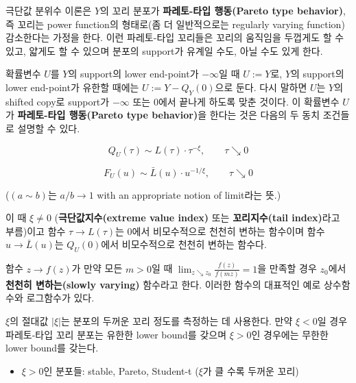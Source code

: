 \documentclass[b5paper,]{scrbook}
\providecommand{\tightlist}{%
  \setlength{\itemsep}{0pt}\setlength{\parskip}{0pt}}
\theoremstyle{plain}
\theoremstyle{definition}
\numberwithin{equation}{section}
\let\BeginKnitrBlock\begin \let\EndKnitrBlock\end
\begin{document}
극단값 분위수 이론은 \(Y\)의 꼬리 분포가 \textbf{파레토-타입 행동(Pareto type behavior)}, 즉 꼬리는 power function의 형태로(좀 더 일반적으로는 regularly varying function) 감소한다는 가정을 한다. 이런 파레토-타입 꼬리들은 꼬리의 움직임을 두껍게도 할 수 있고, 얇게도 할 수 있으며 분포의 support가 유계일 수도, 아닐 수도 있게 한다.

확률변수 \(U\)를 \(Y\)의 support의 lower end-point가 \(-\infty\)일 때 \(U:=Y\)로, \(Y\)의 support의 lower end-point가 유한할 때에는 \(U:=Y-Q_{Y}(0)\)으로 둔다. 다시 말하면 \(U\)는 \(Y\)의 shifted copy로 support가 \(-\infty\) 또는 \(0\)에서 끝나게 하도록 맞춘 것이다. 이 확률변수 \(U\)가 \textbf{파레토-타입 행동(Pareto type behavior)}을 한다는 것은 다음의 두 동치 조건들로 설명할 수 있다.

\begin{equation}
Q_{U}(\tau)\sim L(\tau)\cdot \tau^{-\xi}, \qquad{\tau\searrow 0}
\label{eq:Paretotypetail}
\end{equation}

\begin{equation}
F_{U}(u)\sim \bar{L}(u)\cdot u^{-1/\xi}, \qquad{\tau\searrow 0}
\end{equation}

(\((a\sim b)\)는 \(a/b\rightarrow 1\) with an appropriate notion of limit라는 뜻.)

이 때 \(\xi \neq 0\) (\textbf{극단값지수(extreme value index)} 또는 \textbf{꼬리지수(tail index)}라고 부름)이고 함수 \(\tau \rightarrow L(\tau)\)는 0에서 비모수적으로 천천히 변하는 함수이며 함수 \(u \rightarrow \bar{L}(u)\)는 \(Q_{U}(0)\)에서 비모수적으로 천천히 변하는 함수다.

\BeginKnitrBlock{definition}[천천히 변하는 함수]
\protect\hypertarget{def:unnamed-chunk-349}{}{\label{def:unnamed-chunk-349} {} }함수 \(z\rightarrow f(z)\)가 만약 모든 \(m>0\)일 때 \(\lim_{z\searrow z_{0}}\frac{f(z)}{f(mz)}=1\)을 만족할 경우 \(z_{0}\)에서 \textbf{천천히 변하는(slowly varying)} 함수라고 한다. 이러한 함수의 대표적인 예로 상수함수와 로그함수가 있다.
\EndKnitrBlock{definition}

\(\xi\)의 절대값 \(|\xi |\)는 분포의 두꺼운 꼬리 정도를 측정하는 데 사용한다. 만약 \(\xi<0\)일 경우 파레토-타입 꼬리 분포는 유한한 lower bound를 갖으며 \(\xi>0\)인 경우에는 무한한 lower bound를 갖는다.

\begin{itemize}
\tightlist
\item
  \(\xi>0\)인 분포들: stable, Pareto, Student-t (\(\xi\)가 클 수록 두꺼운 꼬리)
\end{itemize}
\end{document}
